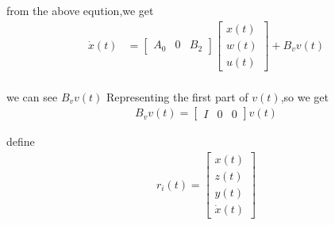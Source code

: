 \documentclass[twocolumn]{autart}    %
\begin{document}
\begin{pf}
    from the above eqution,we get
    \begin{equation}
        \begin{aligned}
                \dot{x}(t) 
            & = \begin{bmatrix}
                A_{0} & 0 & B_{2}
            \end{bmatrix}\begin{bmatrix}
                x(t) \\
                w(t) \\
                u(t) 
            \end{bmatrix} + 
                B_{v} v(t)\\
        \end{aligned}
    \end{equation}
    
    we can see $B_{v}v(t)$ Representing the first part of $v(t)$,so we get
    \begin{equation}
        \begin{aligned}
                B_{v} v(t) = \begin{bmatrix}
                    I & 0 & 0
                \end{bmatrix}v(t)
        \end{aligned}
    \end{equation}
    
    define 
    \begin{equation}
        \begin{aligned}
            r_{i}(t) = \begin{bmatrix}
                x(t) \\
                z(t) \\
                y(t) \\
                \dot{x}(t)
            \end{bmatrix} 
        \end{aligned}
    \end{equation}
    

\end{pf}
\end{document}
